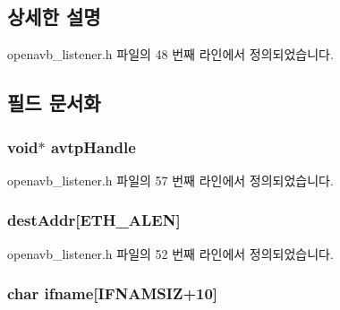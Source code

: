 \subsection{상세한 설명}


openavb\+\_\+listener.\+h 파일의 48 번째 라인에서 정의되었습니다.



\subsection{필드 문서화}
\subsubsection[{\texorpdfstring{avtp\+Handle}{avtpHandle}}]{\setlength{\rightskip}{0pt plus 5cm}void$\ast$ avtp\+Handle}\hypertarget{structlistener__data__t_a4b9351eb0c3d027b65d2babae355d2c1}{}\label{structlistener__data__t_a4b9351eb0c3d027b65d2babae355d2c1}


openavb\+\_\+listener.\+h 파일의 57 번째 라인에서 정의되었습니다.

\subsubsection[{\texorpdfstring{dest\+Addr}{destAddr}}]{ dest\+Addr\mbox{[}{\bf E\+T\+H\+\_\+\+A\+L\+EN}\mbox{]}}\hypertarget{structlistener__data__t_a016f2167ae2143dcacd762c10be2f614}{}\label{structlistener__data__t_a016f2167ae2143dcacd762c10be2f614}


openavb\+\_\+listener.\+h 파일의 52 번째 라인에서 정의되었습니다.

\subsubsection[{\texorpdfstring{ifname}{ifname}}]{\setlength{\rightskip}{0pt plus 5cm}char ifname\mbox{[}{\bf I\+F\+N\+A\+M\+S\+IZ}+10\mbox{]}}\hypertarget{structlistener__data__t_a11d6071e5fa37b0c5776e17651485f11}{}\label{structlistener__data__t_a11d6071e5fa37b0c5776e17651485f11}


